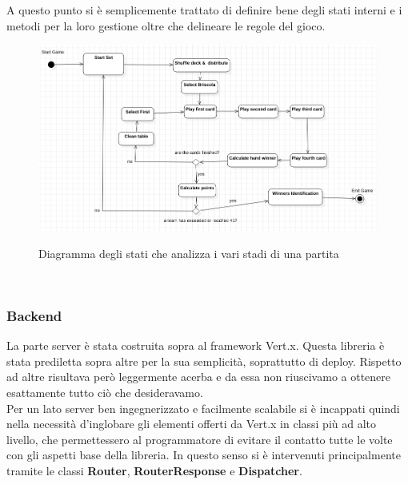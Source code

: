 	  A questo punto si è semplicemente trattato di definire bene degli stati interni e i metodi per la loro gestione oltre che delineare le regole del gioco.
            \begin{figure}[!h]
                \includegraphics[scale=0.5]{image/MatchStateChar.png}
                \label{fig:MatchStateChar}
                \caption{Diagramma degli stati che analizza i vari stadi di una partita}
            \end{figure}
	  \\
	  \subsubsection{Backend}
	  La parte server è stata costruita sopra al framework Vert.x. Questa libreria è stata prediletta sopra altre per la sua semplicità, soprattutto di deploy. Rispetto ad altre risultava però leggermente acerba e da essa non riuscivamo a ottenere esattamente tutto ciò che desideravamo. 
	  \\
	  Per un lato server ben ingegnerizzato e facilmente scalabile si è incappati quindi nella necessità d'inglobare gli elementi offerti da Vert.x in classi più ad alto livello, che permettessero al programmatore di evitare il contatto tutte le volte con gli aspetti base della libreria. 
	  In questo senso si è intervenuti principalmente tramite le classi \textbf{Router}, \textbf{RouterResponse} e \textbf{Dispatcher}.
	  
